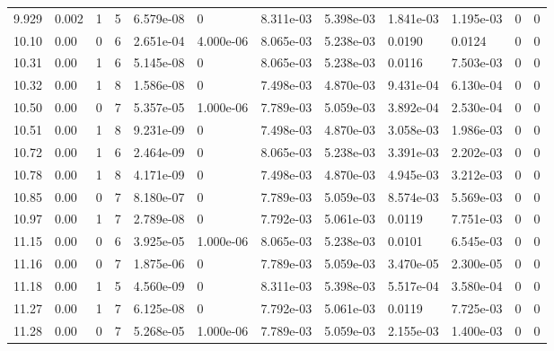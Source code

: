\documentclass[preview]{standalone}
\begin{document}
{{{{\begin{tabular}{L{1.2cm}C{1.2cm} C{0.3cm}C{0.5cm} C{1.4cm}C{1.4cm} C{1.4cm}C{1.4cm} C{1.6cm}C{1.6cm} C{1.6cm}C{1.6cm}}
  9.929  &  0.002  & 1     &  5 &  6.579e-08  & 0  &  8.311e-03&   5.398e-03& 1.841e-03 & 1.195e-03   &  0 & 0  \\ 
  10.10  &  0.00  & 0     &  6 &  2.651e-04  & 4.000e-06  &  8.065e-03&   5.238e-03& 0.0190 & 0.0124   &  0 & 0  \\ 
  10.31  &  0.00  & 1     &  6 &  5.145e-08  & 0  &  8.065e-03&   5.238e-03& 0.0116 & 7.503e-03   &  0 & 0  \\ 
  10.32  &  0.00  & 1     &  8 &  1.586e-08  & 0  &  7.498e-03&   4.870e-03& 9.431e-04 & 6.130e-04   &  0 & 0  \\ 
  10.50  &  0.00  & 0     &  7 &  5.357e-05  & 1.000e-06  &  7.789e-03&   5.059e-03& 3.892e-04 & 2.530e-04   &  0 & 0  \\ 
  10.51  &  0.00  & 1     &  8 &  9.231e-09  & 0  &  7.498e-03&   4.870e-03& 3.058e-03 & 1.986e-03   &  0 & 0  \\ 
  10.72  &  0.00  & 1     &  6 &  2.464e-09  & 0  &  8.065e-03&   5.238e-03& 3.391e-03 & 2.202e-03   &  0 & 0  \\ 
  10.78  &  0.00  & 1     &  8 &  4.171e-09  & 0  &  7.498e-03&   4.870e-03& 4.945e-03 & 3.212e-03   &  0 & 0  \\ 
  10.85  &  0.00  & 0     &  7 &  8.180e-07  & 0  &  7.789e-03&   5.059e-03& 8.574e-03 & 5.569e-03   &  0 & 0  \\ 
  10.97  &  0.00  & 1     &  7 &  2.789e-08  & 0  &  7.792e-03&   5.061e-03& 0.0119 & 7.751e-03   &  0 & 0  \\ 
  11.15  &  0.00  & 0     &  6 &  3.925e-05  & 1.000e-06  &  8.065e-03&   5.238e-03& 0.0101 & 6.545e-03   &  0 & 0  \\ 
  11.16  &  0.00  & 0     &  7 &  1.875e-06  & 0  &  7.789e-03&   5.059e-03& 3.470e-05 & 2.300e-05   &  0 & 0  \\ 
  11.18  &  0.00  & 1     &  5 &  4.560e-09  & 0  &  8.311e-03&   5.398e-03& 5.517e-04 & 3.580e-04   &  0 & 0  \\ 
  11.27  &  0.00  & 1     &  7 &  6.125e-08  & 0  &  7.792e-03&   5.061e-03& 0.0119 & 7.725e-03   &  0 & 0  \\ 
  11.28  &  0.00  & 0     &  7 &  5.268e-05  & 1.000e-06  &  7.789e-03&   5.059e-03& 2.155e-03 & 1.400e-03   &  0 & 0  \\ 
\hline 
\end{tabular} 

}}}}
\end{document}
